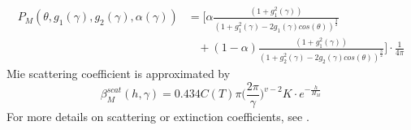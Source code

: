\documentclass{ctuthesis}
\begin{document}
\begin{equation}
\begin{split}
    P_{M}(\theta, g_{1}(\gamma), g_{2}(\gamma), \alpha(\gamma)) & = \bigg[\alpha \frac{(1+g_{1}^{2}(\gamma))}{(1 + g_{1}^{2}(\gamma) - 2g_{1}(\gamma) cos(\theta))^{\frac{3}{2}}} \\
    & \ \ \ \ + (1- \alpha) \frac{(1+g_{1}^{2}(\gamma))}{(1 + g_{2}^{2}(\gamma) - 2g_{2}(\gamma) cos(\theta))^{\frac{3}{2}}} \bigg] \cdot \frac{1}{4 \pi}
\end{split}
\end{equation}
Mie scattering coefficient is approximated by 
\begin{equation}
    \beta_{M}^{scat}(h, \gamma) = 0.434C(T)\pi \bigg(\frac{2\pi}{\gamma} \bigg)^{v -2} K \cdot e^{-\frac{h}{H_{M}}}
\end{equation}
For more details on scattering or extinction coefficients, see 
\cite{costa_bock_emmart_hansen_ynnerman_silva_2021}.
\end{document}

